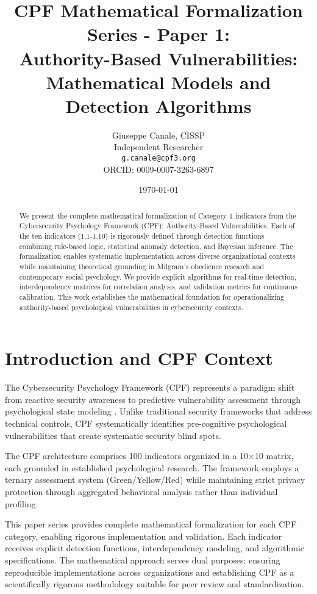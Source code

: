 \documentclass[11pt,a4paper]{article}
\title{CPF Mathematical Formalization Series - Paper 1:\\Authority-Based Vulnerabilities: Mathematical Models and Detection Algorithms}
\author{
    Giuseppe Canale, CISSP\\
    Independent Researcher\\
    \texttt{g.canale@cpf3.org}\\
    ORCID: 0009-0007-3263-6897
}
\date{\today}
\begin{document}
\maketitle

\begin{abstract}
We present the complete mathematical formalization of Category 1 indicators from the Cybersecurity Psychology Framework (CPF): Authority-Based Vulnerabilities. Each of the ten indicators (1.1-1.10) is rigorously defined through detection functions combining rule-based logic, statistical anomaly detection, and Bayesian inference. The formalization enables systematic implementation across diverse organizational contexts while maintaining theoretical grounding in Milgram's obedience research and contemporary social psychology. We provide explicit algorithms for real-time detection, interdependency matrices for correlation analysis, and validation metrics for continuous calibration. This work establishes the mathematical foundation for operationalizing authority-based psychological vulnerabilities in cybersecurity contexts.
\end{abstract}

\section{Introduction and CPF Context}

The Cybersecurity Psychology Framework (CPF) represents a paradigm shift from reactive security awareness to predictive vulnerability assessment through psychological state modeling \cite{canale2024cpf}. Unlike traditional security frameworks that address technical controls, CPF systematically identifies pre-cognitive psychological vulnerabilities that create systematic security blind spots.

The CPF architecture comprises 100 indicators organized in a 10×10 matrix, each grounded in established psychological research. The framework employs a ternary assessment system (Green/Yellow/Red) while maintaining strict privacy protection through aggregated behavioral analysis rather than individual profiling.

This paper series provides complete mathematical formalization for each CPF category, enabling rigorous implementation and validation. Each indicator receives explicit detection functions, interdependency modeling, and algorithmic specifications. The mathematical approach serves dual purposes: ensuring reproducible implementations across organizations and establishing CPF as a scientifically rigorous methodology suitable for peer review and standardization.
\end{document}
